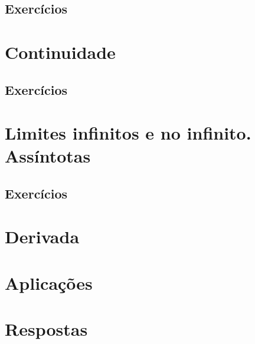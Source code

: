 \documentclass[paper=a4, fontsize=11pt]{scrartcl} %
\begin{document}
\subsection{Exercícios}


\section{Continuidade}

\subsection{Exercícios}

\section{Limites infinitos e no infinito. Assíntotas}

\subsection{Exercícios}



\section{Derivada}


 \section{Aplicações}

\section{Respostas}


\end{document}

